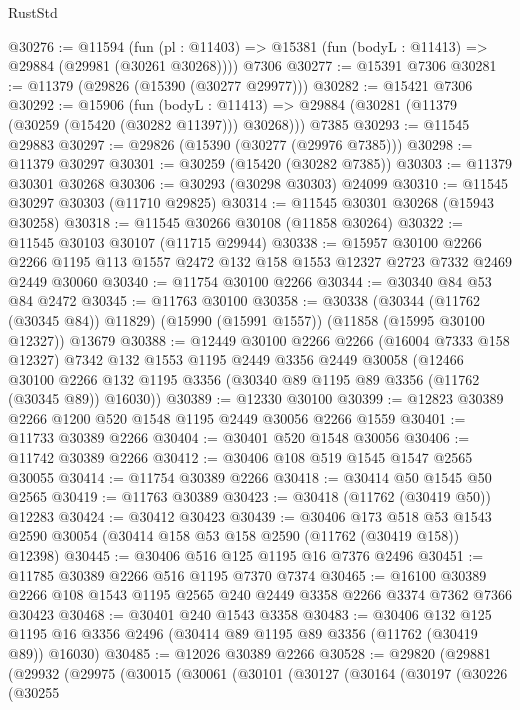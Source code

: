 \begin{lexlean}{RustStd}
\begin{coremodule}
@30276 := @11594
    (fun (pl : @11403) => @15381 (fun (bodyL : @11413) => @29884 (@29981 (@30261 @30268))))
    @7306
@30277 := @15391 @7306
@30281 := @11379 (@29826 (@15390 (@30277 @29977)))
@30282 := @15421 @7306
@30292 := @15906
    (fun (bodyL : @11413) => @29884 (@30281 (@11379 (@30259 (@15420 (@30282 @11397))) @30268)))
    @7385
@30293 := @11545 @29883
@30297 := @29826 (@15390 (@30277 (@29976 @7385)))
@30298 := @11379 @30297
@30301 := @30259 (@15420 (@30282 @7385))
@30303 := @11379 @30301 @30268
@30306 := @30293 (@30298 @30303) @24099
@30310 := @11545 @30297 @30303 (@11710 @29825)
@30314 := @11545 @30301 @30268 (@15943 @30258)
@30318 := @11545 @30266 @30108 (@11858 @30264)
@30322 := @11545 @30103 @30107 (@11715 @29944)
@30338 := @15957
    @30100
    @2266
    @2266
    @1195
    @113
    @1557
    @2472
    @132
    @158
    @1553
    @12327
    @2723
    @7332
    @2469
    @2449
    @30060
@30340 := @11754 @30100 @2266
@30344 := @30340 @84 @53 @84 @2472
@30345 := @11763 @30100
@30358 := @30338
    (@30344 (@11762 (@30345 @84)) @11829)
    (@15990 (@15991 @1557))
    (@11858 (@15995 @30100 @12327))
    @13679
@30388 := @12449
    @30100
    @2266
    @2266
    (@16004 @7333 @158 @12327)
    @7342
    @132
    @1553
    @1195
    @2449
    @3356
    @2449
    @30058
    (@12466 @30100 @2266 @132 @1195 @3356 (@30340 @89 @1195 @89 @3356 (@11762 (@30345 @89)) @16030))
@30389 := @12330 @30100
@30399 := @12823 @30389 @2266 @1200 @520 @1548 @1195 @2449 @30056 @2266 @1559
@30401 := @11733 @30389 @2266
@30404 := @30401 @520 @1548 @30056
@30406 := @11742 @30389 @2266
@30412 := @30406 @108 @519 @1545 @1547 @2565 @30055
@30414 := @11754 @30389 @2266
@30418 := @30414 @50 @1545 @50 @2565
@30419 := @11763 @30389
@30423 := @30418 (@11762 (@30419 @50)) @12283
@30424 := @30412 @30423
@30439 := @30406
    @173
    @518
    @53
    @1543
    @2590
    @30054
    (@30414 @158 @53 @158 @2590 (@11762 (@30419 @158)) @12398)
@30445 := @30406 @516 @125 @1195 @16 @7376 @2496
@30451 := @11785 @30389 @2266 @516 @1195 @7370 @7374
@30465 := @16100 @30389 @2266 @108 @1543 @1195 @2565 @240 @2449 @3358 @2266 @3374 @7362 @7366 @30423
@30468 := @30401 @240 @1543 @3358
@30483 := @30406
    @132
    @125
    @1195
    @16
    @3356
    @2496
    (@30414 @89 @1195 @89 @3356 (@11762 (@30419 @89)) @16030)
@30485 := @12026 @30389 @2266
@30528 := @29820
    (@29881
      (@29932
        (@29975
          (@30015
            (@30061
              (@30101
                (@30127
                  (@30164
                    (@30197
                      (@30226
                        (@30255

\end{coremodule}
\end{lexlean}
